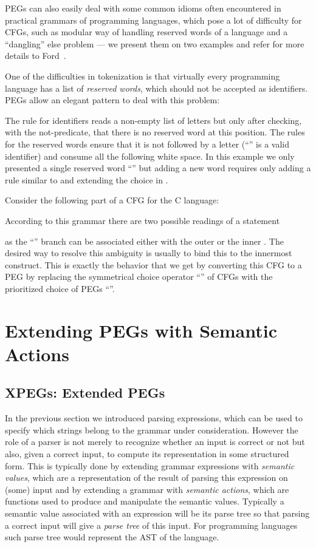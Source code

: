 \documentclass{LMCS}
\newcommand{\exqed}{\hfill\vspace{1ex}}
\theoremstyle{definition}
\begin{document}
PEGs can also easily deal with some common idioms often encountered in practical 
grammars of programming languages, which pose a lot of difficulty for CFGs, such
as modular way of handling reserved words of a language and a ``dangling'' else problem 
--- we present them on two examples and refer for more details to Ford~\cite[Chapter 2.4]{For02mth}.

\begin{exa}
One of the difficulties in tokenization is that virtually every programming 
language has a list of \emph{reserved words}, which should not be accepted 
as identifiers. PEGs allow an elegant pattern to deal with this problem:

The rule  for identifiers reads a non-empty list of letters 
but only after checking, with the not-predicate, that there is no 
reserved word at this position. The rules for the reserved words 
ensure that it is not followed by a letter (``''
is a valid identifier) and consume all the following white space.
In this example we only presented a single reserved word ``''
but adding a new word requires only adding a rule similar to  
and extending the choice in .
\exqed
\end{exa}

\begin{exa}
Consider the following part of a CFG for the C language:

According to this grammar there are two possible readings of a statement

as the ``'' branch can be associated either with the 
outer or the inner . The desired way to resolve this 
ambiguity is usually to bind this  to the innermost construct.
This is exactly the behavior that we get by converting this CFG to a PEG
by replacing the symmetrical choice operator ``'' of CFGs with the
prioritized choice of PEGs ``''.
\exqed
\end{exa}
 \section{Extending PEGs with Semantic Actions}\label{sec:pegs-actions}

\subsection{XPEGs: Extended PEGs}

  In the previous section we introduced parsing expressions, which can be
used to specify which strings belong to the grammar under consideration.
However the role of a parser is not merely to recognize whether an input is
correct or not but also, given a correct input, to compute its representation
in some structured form. This is typically done by extending grammar expressions
with \emph{semantic values}, which are a representation of the result of parsing 
this expression on (some) input and by extending a grammar with \emph{semantic
actions}, which are functions used to produce and manipulate the semantic 
values. Typically a semantic value associated with an expression will be
its parse tree so that parsing a correct input will give a \emph{parse tree} of this
input. For programming languages such parse tree would represent the AST of 
the language.
\end{document}
